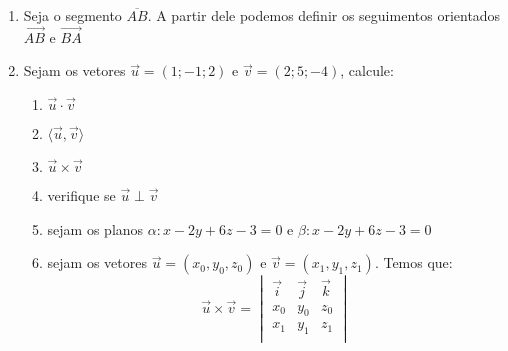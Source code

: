 \documentclass[a4paper]{article}
\begin{document}
\begin{enumerate}

	\item Seja o segmento $ \overline{AB} $. A partir dele podemos definir os seguimentos
	orientados $ \overrightarrow{AB} $ e $ \overrightarrow{BA} $
	
	\item Sejam os vetores $ \vec{u} = (1; -1; 2) $ e $ \vec{v} = (2; 5; -4) $, calcule:
	\begin{enumerate}
		\item $ \vec{u} \cdot \vec{v} $
		\item $ \langle \vec{u},\vec{v} \rangle $
		\item $ \vec{u} \times \vec{v} $
		\item verifique se $ \vec{u} \perp \vec{v} $
		\item sejam os planos $ \alpha : x - 2y + 6z - 3 = 0 $ e $ \beta : x - 2y + 6z - 3 = 0 $
		\item sejam os vetores $ \vec{u} = (x_0, y_0, z_0) $ e $ \vec{v} = (x_1,y_1,z_1) $. Temos que:
		$$		
		\vec{u} \times \vec{v} = 
		\begin{vmatrix}
			\vec{i} & \vec{j} & \vec{k} \\
			x_0 & y_0 & z_0 \\
			x_1 & y_1 & z_1 \\
		\end{vmatrix}		
		$$
	\end{enumerate}
				
\end{enumerate}
\end{document}
